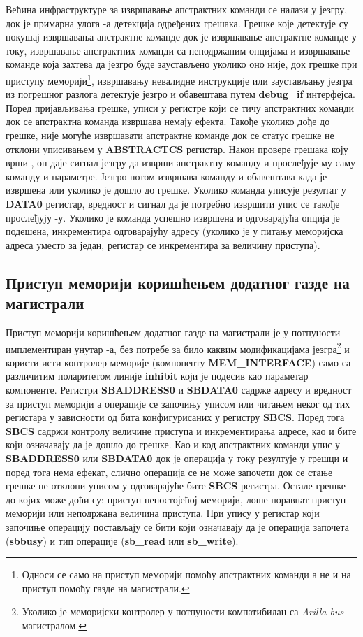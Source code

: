 Већина инфраструктуре за извршавање апстрактних команди се налази у језгру, док је примарна улога -а детекција одређених грешака. Грешке које  детектује су покушај извршавања апстрактне команде док је извршавање апстрактне команде у току, извршавање апстрактних команди са неподржаним опцијама и извршавање команде која захтева да језгро буде заустављено уколико оно није, док грешке при приступу меморији\footnote{Односи се само на приступ меморији помоћу апстрактних команди а не и на приступ помоћу газде на магистрали.}, извршавању невалидне инструкције или заустављању језгра из погрешног разлога детектује језгро и обавештава  путем \textbf{debug\_if} интерфејса. Поред пријављивања грешке, уписи у регистре који се тичу апстрактних команди док се апстрактна команда извршава немају ефекта. Такође уколико дође до грешке, није могуће извршавати апстрактне команде док се статус грешке не отклони уписивањем у  \textbf{\acrshort{ABSTRACTCS}} регистар. Након провере грешака коју врши , он даје сигнал језгру да изврши апстрактну команду и прослеђује му саму команду и параметре. Језгро потом извршава команду и обавештава  када је извршена или уколико је дошло до грешке. Уколико команда уписује резултат у \textbf{DATA0} регистар, вредност и сигнал да је потребно извршити упис се такође прослеђују -у. Уколико је команда успешно извршена и одговарајућа опција је подешена,  инкрементира одговарајућу адресу (уколико је у питању меморијска адреса уместо за један, регистар се инкрементира за величину приступа).

\subsection{Приступ меморији коришћењем додатног газде на магистрали}

Приступ меморији коришћењем додатног газде на магистрали је у потпуности имплементиран унутар -а, без потребе за било каквим модификацијама језгра\footnote{Уколико је меморијски контролер у потпуности компатибилан са \textit{Arilla bus} магистралом.} и користи исти контролер меморије (компоненту \textbf{MEM\_INTERFACE}) само са различитим поларитетом линије \textbf{inhibit} који је подесив као параметар компоненте. Регистри \textbf{\acrshort{SBADDRESS}0} и \textbf{\acrshort{SBDATA}0} садрже адресу и вредност за приступ меморији а операције се започињу уписом или читањем неког од тих регистара у зависности од бита конфигурисаних у регистру \textbf{\acrshort{SBCS}}. Поред тога \textbf{\acrshort{SBCS}} садржи контролу величине приступа и инкрементирања адресе, као и бите који означавају да је дошло до грешке. Као и код апстрактних команди упис у \textbf{\acrshort{SBADDRESS}0} или \textbf{\acrshort{SBDATA}0} док је операција у току резултује у грешци и поред тога нема ефекат, слично операција се не може започети док се стање грешке не отклони уписом у одговарајуће бите \textbf{\acrshort{SBCS}} регистра. Остале грешке до којих може доћи су: приступ непостојећој меморији, лоше поравнат приступ меморији или неподржана величина приступа. При упису у регистар који започиње операцију постављају се бити који означавају да је операција започета (\textbf{sbbusy}) и тип операције (\textbf{sb\_read} или \textbf{sb\_write}).


